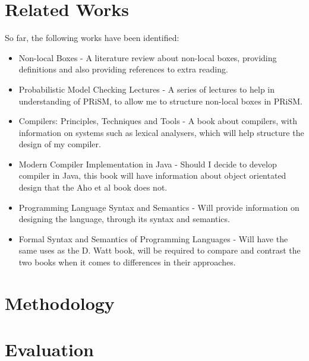 \documentclass[11pt, a4paper]{article}
\begin{document}

\section{Related Works} %
\label{sec:related_works}
So far, the following works have been identified:
\begin{itemize}
    \item Non-local Boxes\cite{nlb_lamontague} - A literature review about
    non-local boxes, providing definitions and also providing references to
    extra reading.
    \item Probabilistic Model Checking Lectures\cite{prism_lectures} - A series
    of lectures to help in understanding of PRiSM, to allow me to structure
    non-local boxes in PRiSM.
    \item Compilers: Principles, Techniques and Tools\cite{dragon_compiler} - A
    book about compilers, with information on systems such as lexical analysers,
    which will help structure the design of my compiler.
    \item Modern Compiler Implementation in Java\cite{java_compiler} - Should I
    decide to develop compiler in Java, this book will have information about
    object orientated design that the Aho et al book does not.
    \item Programming Language Syntax and Semantics\cite{plss} - Will provide
    information on designing the language, through its syntax and semantics.
    \item Formal Syntax and Semantics of Programming Languages\cite{fsspl} -
    Will have the same uses as the D. Watt book, will be required to compare and
    contrast the two books when it comes to differences in their approaches.
\end{itemize}


\section{Methodology} %
\label{sec:methodology}


\section{Evaluation} %
\label{sec:evaluation}

\end{document}
